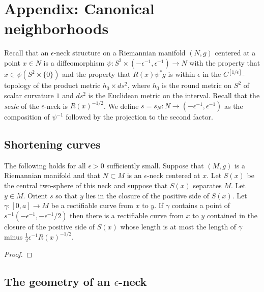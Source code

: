 \chapter{Appendix: Canonical neighborhoods}
\label{chap:canonical-neighborhoods}
\label{sect:canonnbhd}


Recall that an $\epsilon$-neck structure on a Riemannian manifold
$(N,g)$ centered at a point $x\in N$ is a diffeomorphism $\psi\colon
S^2\times (-\epsilon^{-1},\epsilon^{-1})\to N$ with the property
that $x\in \psi(S^2\times\{0\})$ and the property that $R(x)\psi^*g$
is within $\epsilon$ in the $C^{[1/\epsilon]}$-topology of the
product metric $h_0\times ds^2$, where $h_0$ is the round metric on
$S^2$ of scalar curvature $1$ and $ds^2$ is the Euclidean metric on
the interval. Recall that the {\em scale} of the $\epsilon$-neck is
$R(x)^{-1/2}$. We define $s=s_N\colon N\to
(-\epsilon^{-1},\epsilon^{-1})$ as the composition of $\psi^{-1}$
followed by the projection to the second factor.


\section{Shortening curves}

\begin{lemma}
\label{lem:neck-shortening-curve}
\label{curveshort}

The following holds for all $\epsilon>0$ sufficiently small. Suppose
that $(M,g)$ is a Riemannian manifold and that $N\subset M$ is an
$\epsilon$-neck centered at $x$. Let $S(x)$ be the central
two-sphere of this neck and suppose that $S(x)$ separates $M$. Let
$y\in M$. Orient $s$ so that $y$ lies in the closure of the positive
side of $S(x)$. Let $\gamma\colon [0,a]\to M$ be a rectifiable curve
from $x$ to $y$. If $\gamma$ contains a point of
$s^{-1}(-\epsilon^{-1},-\epsilon^{-1}/2)$ then there is a
rectifiable curve from $x$ to $y$ contained in the closure of the
positive side of $S(x)$ whose length is at most the length of
$\gamma$ minus $\frac{1}{2}\epsilon^{-1}R(x)^{-1/2}$.
\end{lemma}


\begin{proof}
\sketch
{}
\end{proof}



\section{The geometry of an $\epsilon$-neck}


